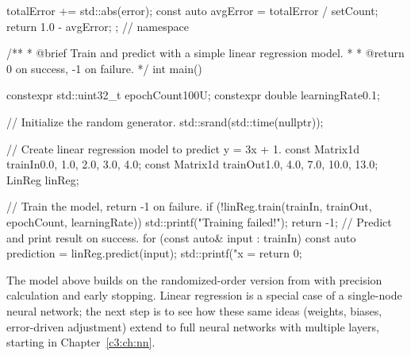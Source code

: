 \begin{cppcode}
{{{{            totalError += std::abs(error);
        }
        const auto avgError = totalError / setCount;
        return 1.0 - avgError;
    }
};
} // namespace

/**
 * @brief Train and predict with a simple linear regression model.
 *
 * @return 0 on success, -1 on failure.
 */
int main()
{
    constexpr std::uint32_t epochCount{100U};
    constexpr double learningRate{0.1};

    // Initialize the random generator.
    std::srand(std::time(nullptr));

    // Create linear regression model to predict y = 3x + 1.
    const Matrix1d trainIn{0.0, 1.0, 2.0, 3.0, 4.0};
    const Matrix1d trainOut{1.0, 4.0, 7.0, 10.0, 13.0};
    LinReg linReg{};

    // Train the model, return -1 on failure.
    if (!linReg.train(trainIn, trainOut, epochCount, learningRate))
    {
        std::printf("Training failed!\n");
        return -1;
    }
    // Predict and print result on success.
    for (const auto& input : trainIn)
    {
        const auto prediction = linReg.predict(input);
        std::printf("x = %
    }
    return 0;
}
\end{cppcode}

The model above builds on the randomized-order version from  with precision
calculation and early stopping. Linear regression is a special case of a single-node neural
network; the next step is to see how these same ideas (weights, biases, error-driven adjustment)
extend to full neural networks with multiple layers, starting in Chapter~\ref{c3:ch:nn}.
